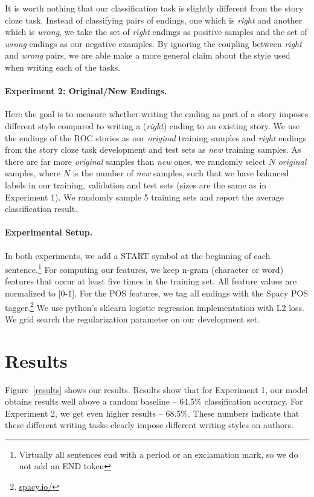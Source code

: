 \documentclass[11pt,a4paper]{article}
\newcommand{\figref}[1]{Figure~\ref{#1}}
\newcommand{\isectionb}[1]{\section{#1}\label{ssec:#1}}
\begin{document}
It is worth nothing that our classification task is slightly different from the { story cloze task}. 
Instead of classifying pairs of endings, one which is {\it right} and another which is {\it wrong}, we take the set of  {\it right} endings as positive samples and the set of {\it wrong} endings as our negative examples. 
By ignoring the coupling between {\it right} and {\it wrong} pairs, we are able make a more general claim about the style used when writing each of the tasks.

\paragraph{Experiment 2: Original/New Endings.}

Here the goal is to measure whether writing the ending as part of a story imposes different style compared to writing a ({\it right}) ending to an existing story.
We use the endings of the ROC stories as our {\it original} training samples and {\it right} endings from the story cloze task  development and test sets as {\it new} training samples.
As there are far more {\it original} samples than {\it new} ones, we randomly select $N$ {\it original} samples, where $N$ is the number of {\it new} samples,
such that we have balanced labels in our training, validation and test sets (sizes are the same as in Experiment 1).
We randomly sample 5 training sets and report the average classification result.

\paragraph{Experimental Setup.}
In both experiments, we add a START symbol at the beginning of each sentence.\footnote{Virtually all sentences end with a period or an exclamation mark, so we do not add an END token} 
For computing our features, we keep n-gram (character or word) features that occur at least five times in the training set.
All feature values are normalized to [0-1].
For the POS features, we tag all endings with the Spacy POS tagger.\footnote{\url{spacy.io/}}
We use  python's sklearn logistic regression implementation with L2 loss. 
We grid search the regularization parameter on our development set. 


\isectionb{Results}
\figref{results} shows our results.
Results show that for Experiment 1, our model obtains results well above a random baseline -- 64.5\% classification accuracy. 
For Experiment 2, we get even higher results -- 68.5\%. 
These numbers indicate that these different writing tasks clearly impose different writing styles on authors. 
\end{document}
